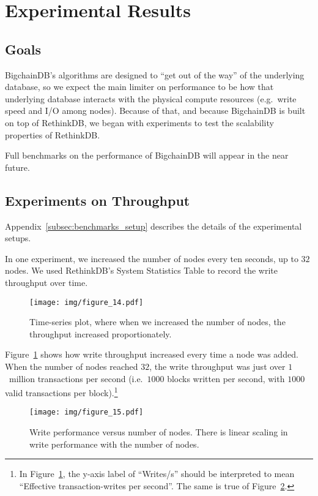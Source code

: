 \section{Experimental Results}\label{sec:benchmarks}

\subsection{Goals}

BigchainDB's algorithms are designed to ``get out of the way'' of the underlying database, so we expect the main limiter on performance to be how that underlying database interacts with the physical compute resources (e.g.~write speed and I/O among nodes).
Because of that, and because BigchainDB is built on top of RethinkDB, we began with experiments to test the scalability properties of RethinkDB.

Full benchmarks on the performance of BigchainDB will appear in the near future.

\subsection{Experiments on Throughput}

Appendix~\ref{subsec:benchmarks_setup} describes the details of the experimental setups.

In one experiment, we increased the number of nodes every ten seconds, up to $32$ nodes.
We used RethinkDB's System Statistics Table to record the write throughput over time.

\begin{figure}[!ht]
  \centering
  \texttt{[image: img/figure\_14.pdf]}
  \caption{Time-series plot, where when we increased the number of nodes, the throughput increased proportionately.}
  \label{fig:bigchain_throughput_vs_nodes}
\end{figure}

Figure~\ref{fig:bigchain_throughput_vs_nodes} shows how write throughput increased every time a node was added.
When the number of nodes reached $32$, the write throughput was just over $1$~million transactions per second (i.e.~$1000$ blocks written per second, with $1000$ valid transactions per block).\footnote{
In Figure~\ref{fig:bigchain_throughput_vs_nodes}, the y-axis label of ``Writes/s'' should be interpreted to mean ``Effective transaction-writes per second''. The same is true of Figure~\ref{fig:bigchain_writes_vs_nodes}.}

\begin{figure}[!ht]
  \centering
  \texttt{[image: img/figure\_15.pdf]}
  \caption{Write performance versus number of nodes. There is linear scaling in write performance with the number of nodes.}
  \label{fig:bigchain_writes_vs_nodes}
\end{figure}

